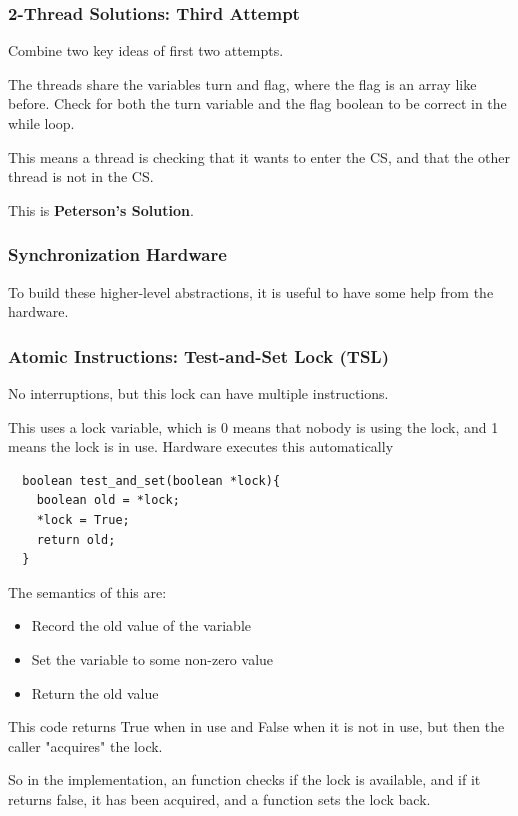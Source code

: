 \documentclass{article}
\begin{document}
\subsubsection{2-Thread Solutions: Third Attempt}

Combine two key ideas of first two attempts.

The threads share the variables turn and flag, where the flag is an array like before. Check for both the turn variable and the flag boolean to be correct in the while loop.

This means a thread is checking that it wants to enter the CS, and that the other thread is not in the CS.

This is \textbf{Peterson's Solution}.


\subsubsection{Synchronization Hardware}

To build these higher-level abstractions, it is useful to have some help from the hardware.

\subsubsection{Atomic Instructions: Test-and-Set Lock (TSL)}

No interruptions, but this lock can have multiple instructions.

This uses a lock variable, which is 0 means that nobody is using the lock, and 1 means the lock is in use. Hardware executes this automatically

\begin{lstlisting}
  boolean test_and_set(boolean *lock){
    boolean old = *lock;
    *lock = True;
    return old;
  }
\end{lstlisting}

The semantics of this are:
\begin{itemize}
  \item Record the old value of the variable
  \item Set the variable to some non-zero value
  \item Return the old value
\end{itemize}

This code returns True when in use and False when it is not in use, but then the caller "acquires" the lock.

So in the implementation, an  function checks if the lock is available, and if it returns false, it has been acquired, and a  function sets the lock back.
\end{document}
